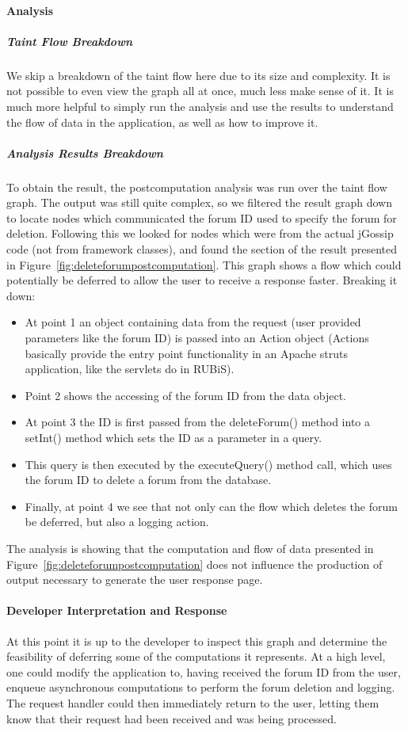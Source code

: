 \documentclass[msc,oneside]{ubcthesis}
\begin{document}
\paragraph{Analysis}
\subparagraph{Taint Flow Breakdown}
We skip a breakdown of the taint flow here due to its size and complexity. It is not possible to even view the graph all at once, much less make sense of it. It is much more helpful to simply run the analysis and use the results to understand the flow of data in the application, as well as how to improve it.

\subparagraph{Analysis Results Breakdown}
To obtain the result, the postcomputation analysis was run over the taint flow graph. The output was still quite complex, so we filtered the result graph down to locate nodes which communicated the forum ID used to specify the forum for deletion. Following this we looked for nodes which were from the actual jGossip code (not from framework classes), and found the section of the result presented in Figure~\ref{fig:deleteforumpostcomputation}. This graph shows a flow which could potentially be deferred to allow the user to receive a response faster. Breaking it down:

\begin{itemize}
\item At point 1 an object containing data from the request (user provided parameters like the forum ID) is passed into an Action object (Actions basically provide the entry point functionality in an Apache struts application, like the servlets do in RUBiS).
\item Point 2 shows the accessing of the forum ID from the data object.
\item At point 3 the ID is first passed from the deleteForum() method into a setInt() method which sets the ID as a parameter in a query.
\item This query is then executed by the executeQuery() method call, which uses the forum ID to delete a forum from the database.
\item Finally, at point 4 we see that not only can the flow which deletes the forum be deferred, but also a logging action.
\end{itemize}

The analysis is showing that the computation and flow of data presented in Figure~\ref{fig:deleteforumpostcomputation} does not influence the production of output necessary to generate the user response page.

\paragraph{Developer Interpretation and Response}
At this point it is up to the developer to inspect this graph and determine the feasibility of deferring some of the computations it represents. At a high level, one could modify the application to, having received  the forum ID from the user, enqueue asynchronous computations to perform the forum deletion and logging. The request handler could then immediately return to the user, letting them know that their request had been received and was being processed. \\
\end{document}
